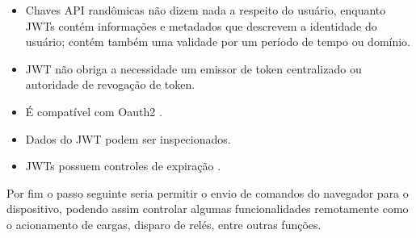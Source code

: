 \begin{itemize}
\itemsep1pt\parskip0pt
\item
  Chaves API randômicas não dizem nada a respeito do usuário, enquanto
  JWTs contém informações e metadados que descrevem a identidade do
  usuário; contém também uma validade por um período de tempo ou
  domínio.
\item
  JWT não obriga a necessidade um emissor de token centralizado ou
  autoridade de revogação de token.
\item
  É compatível com Oauth2 \cite{oauth2:2012}.
\item
  Dados do JWT podem ser inspecionados.
\item
  JWTs possuem controles de expiração \cite{romero:2015}.
\end{itemize}

Por fim o passo seguinte seria permitir o envio de comandos do navegador
para o dispositivo, podendo assim controlar algumas funcionalidades
remotamente como o acionamento de cargas, disparo de relés, entre outras
funções.
